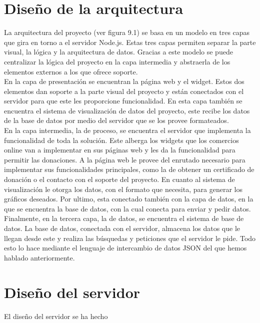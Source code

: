 \section{Diseño de la arquitectura}
La arquitectura del proyecto (ver figura 9.1) se basa en un modelo en tres capas que gira en torno a el servidor Node.js. Estas tres capas permiten separar la parte visual, la lógica y la arquitectura de datos. Gracias a este modelo se puede centralizar la lógica del proyecto en la capa intermedia y abstraerla de los elementos externos a los que ofrece soporte.\\

En la capa de presentación se encuentran la página web y el widget. Estos dos elementos dan soporte a la parte visual del proyecto y están conectados con el servidor para que este les proporcione funcionalidad. En esta capa también se encuentra el sistema de visualización de datos del proyecto, este recibe los datos de la base de datos por medio del servidor que se los provee formateados.\\

En la capa intermedia, la de proceso, se encuentra el servidor que implementa la funcionalidad de toda la solución. Este alberga los widgets que los comercios online van a implementar en sus páginas web y les da la funcionalidad para permitir las donaciones. A la página web le provee del enrutado necesario para implementar sus funcionalidades principales, como la de obtener un certificado de donación o el contacto con el soporte del proyecto. En cuanto al sistema de visualización le otorga los datos, con el formato que necesita, para generar los gráficos deseados. Por ultimo, esta conectado también con la capa de datos, en la que se encuentra la base de datos, con la cual conecta para enviar y pedir datos.\\

Finalmente, en la tercera capa, la de datos, se encuentra el sistema de base de datos. La base de datos, conectada con el servidor, almacena los datos que le llegan desde este y realiza las búsquedas y peticiones que el servidor le pide. Todo esto lo hace mediante el lenguaje de intercambio de datos JSON del que hemos hablado anteriormente.


\section{Diseño del servidor}
El diseño del servidor se ha hecho

